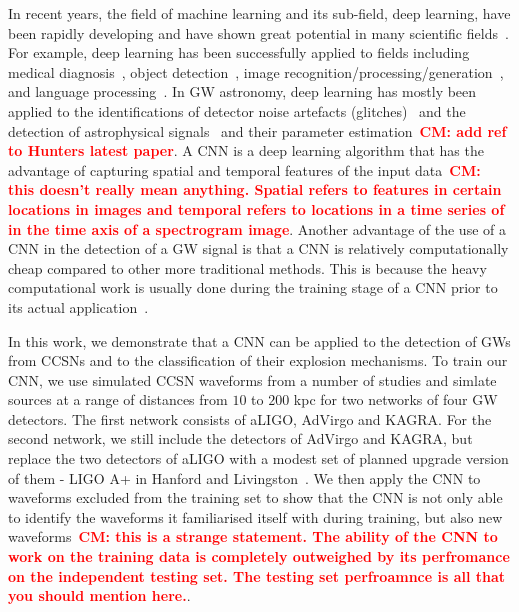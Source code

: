 \documentclass[aps,twocolumn,showpacs,groupedaddress, nofootinbib]{revtex4}  %
\newcommand{\cm}[1]{\textbf{\textcolor{red}{CM: #1}}}
\begin{document}
%
% 
In recent years, the field of machine learning and its sub-field, deep
learning, have been rapidly developing and have shown great potential in many
scientific fields~\cite{krizhevsky2012imagenet, NIPS2014_5423,
simonyan2014very, chen2014semantic, zeiler2014visualizing, szegedy2015going}.
For example, deep learning has been successfully applied to fields including
medical diagnosis~\cite{kononenko2001machine}, object
detection~\cite{redmon2016you}, image
recognition/processing/generation~\cite{he2016deep, krizhevsky2012imagenet,
zhang2016colorful, karpathy2015deep}, and  language
processing~\cite{lample2016neural}. In \ac{GW} astronomy, deep learning has
mostly been applied to the identifications of detector noise artefacts
(glitches)~\cite{mukund2017transient, zevin2017gravity, george2017deep} and the
detection of astrophysical signals~\cite{george2018deep, gabbard2018matching,
astone2018new} and their parameter estimation~\cm{add ref to Hunters latest
paper}. A \ac{CNN} is a deep learning algorithm that has the advantage of
capturing spatial and temporal features of the input data~\cm{this doesn't
really mean anything. Spatial refers to features in certain locations in images
and temporal refers to locations in a time series of in the time axis of a
spectrogram image}. Another advantage of the use of a \ac{CNN} in the detection
of a \ac{GW} signal is that a \ac{CNN} is relatively computationally cheap
compared to other more traditional methods. This is because the heavy
computational work is usually done during the training stage of a \ac{CNN}
prior to its actual application~\cite{goodfellow2016deep}.

%
%
In this work, we demonstrate that a \ac{CNN} can be applied to the detection of
\acp{GW} from \acp{CCSN} and to the classification of their explosion
mechanisms.  To train our \ac{CNN}, we use simulated \ac{CCSN} waveforms from a
number of studies and simlate sources at a range of distances from $10$ to
$200$ kpc for two networks of four \ac{GW} detectors. The first network
consists of \ac{aLIGO}, \ac{AdVirgo} and KAGRA. For the second network, we
still include the detectors of \ac{AdVirgo} and KAGRA, but replace the two
detectors of \ac{aLIGO} with a modest set of planned upgrade version of them -
LIGO A+ in Hanford and Livingston~\cite{miller2015prospects, LIGOW}. We then
apply the \ac{CNN} to waveforms excluded from the training set to show that the
\ac{CNN} is not only able to identify the waveforms it familiarised itself with
during training, but also new waveforms~\cm{this is a strange statement. The
ability of the CNN to work on the training data is completely outweighed by its
perfromance on the independent testing set. The testing set perfroamnce is all
that you should mention here.}.
\end{document}
